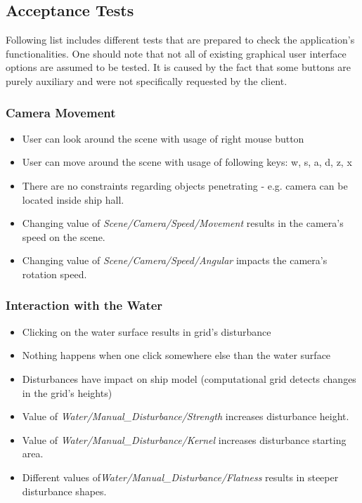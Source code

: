 \documentclass{report}
\begin{document}
\subsection{Acceptance Tests}
Following list includes different tests that are prepared to check the application's functionalities. One should note that not all of  existing graphical user interface options are assumed to be tested. It is caused by the fact that some buttons are purely auxiliary and were not specifically requested by the client.
\subsubsection{Camera Movement}
\begin{itemize}
\item User can look around the scene with usage of right mouse button
\item User can move around the scene with usage of following keys: w, s, a, d, z, x
\item There are no constraints regarding objects penetrating - e.g.  camera can be located inside ship hall.
\item Changing value of \textit{Scene/Camera/Speed/Movement} results in the camera's speed on the scene.
\item Changing value of \textit{Scene/Camera/Speed/Angular} impacts the camera's rotation speed.
\end{itemize}
\subsubsection{Interaction with the Water}
\begin{itemize}
\item Clicking on the water surface results in grid's disturbance
\item Nothing happens when one click somewhere else than the water surface
\item Disturbances have impact on ship model (computational grid detects changes in the grid's heights)
\item Value of \textit{Water/Manual\_Disturbance/Strength} increases disturbance height.
\item Value of \textit{Water/Manual\_Disturbance/Kernel} increases disturbance starting area.
\item Different values of\textit{Water/Manual\_Disturbance/Flatness} results in steeper disturbance shapes.
\end{itemize}
\end{document}
